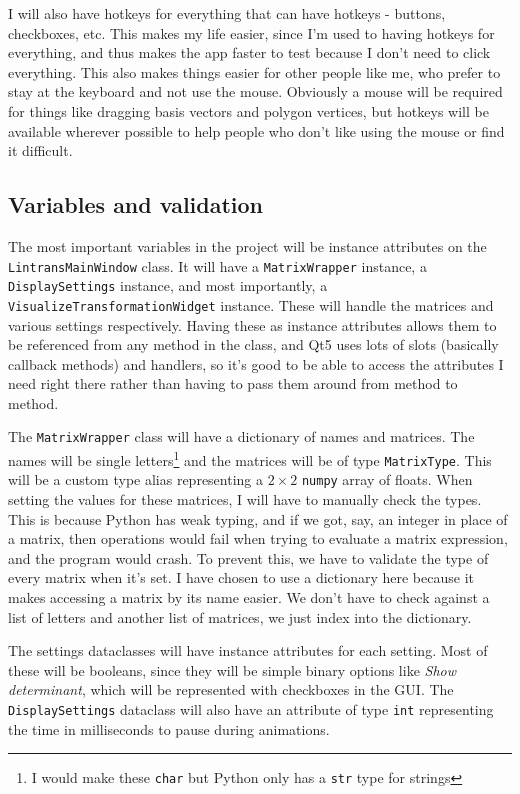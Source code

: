 \documentclass[../main.tex]{subfiles}
\begin{document}
I will also have hotkeys for everything that can have hotkeys - buttons, checkboxes, etc. This makes my life easier, since I'm used to having hotkeys for everything, and thus makes the app faster to test because I don't need to click everything. This also makes things easier for other people like me, who prefer to stay at the keyboard and not use the mouse. Obviously a mouse will be required for things like dragging basis vectors and polygon vertices, but hotkeys will be available wherever possible to help people who don't like using the mouse or find it difficult.

\subsection{Variables and validation\label{design:variables-and-validation}}

The most important variables in the project will be instance attributes on the \texttt{LintransMainWindow} class. It will have a \texttt{MatrixWrapper} instance, a \texttt{DisplaySettings} instance, and most importantly, a \texttt{VisualizeTransformationWidget} instance. These will handle the matrices and various settings respectively. Having these as instance attributes allows them to be referenced from any method in the class, and Qt5 uses lots of slots (basically callback methods) and handlers, so it's good to be able to access the attributes I need right there rather than having to pass them around from method to method.

The \texttt{MatrixWrapper} class will have a dictionary of names and matrices. The names will be single letters\footnote{I would make these \texttt{char} but Python only has a \texttt{str} type for strings} and the matrices will be of type \texttt{MatrixType}. This will be a custom type alias representing a $2 \times 2$ \texttt{numpy} array of floats. When setting the values for these matrices, I will have to manually check the types. This is because Python has weak typing, and if we got, say, an integer in place of a matrix, then operations would fail when trying to evaluate a matrix expression, and the program would crash. To prevent this, we have to validate the type of every matrix when it's set. I have chosen to use a dictionary here because it makes accessing a matrix by its name easier. We don't have to check against a list of letters and another list of matrices, we just index into the dictionary.

The settings dataclasses will have instance attributes for each setting. Most of these will be booleans, since they will be simple binary options like \textit{Show determinant}, which will be represented with checkboxes in the GUI. The \texttt{DisplaySettings} dataclass will also have an attribute of type \texttt{int} representing the time in milliseconds to pause during animations.
\end{document}
